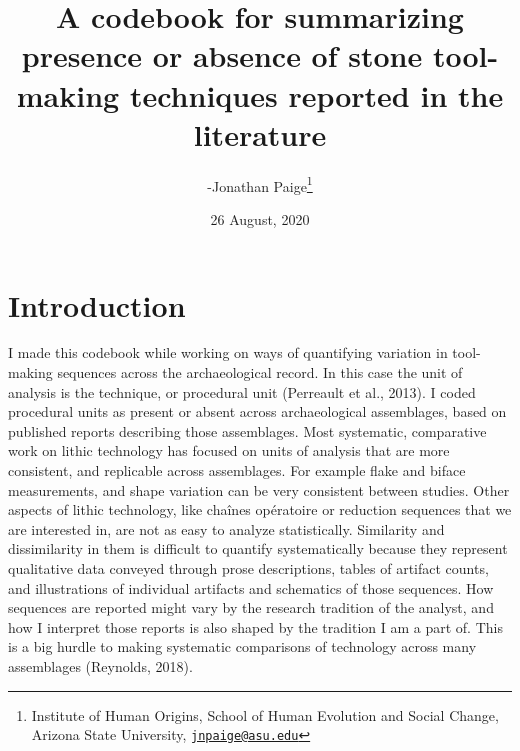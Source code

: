\documentclass[
]{article}
\title{A codebook for summarizing presence or absence of stone tool-making
techniques reported in the literature}
\author{-Jonathan Paige\footnote{Institute of Human Origins, School of Human
  Evolution and Social Change, Arizona State University,
  \href{mailto:jnpaige@asu.edu}{\nolinkurl{jnpaige@asu.edu}}}}
\date{26 August, 2020}
\begin{document}
\maketitle

{
\setcounter{tocdepth}{3}
\tableofcontents
}
\setlength{\parskip}{15pt}

\hypertarget{introduction}{%
\section{Introduction}\label{introduction}}

I made this codebook while working on ways of quantifying variation in
tool-making sequences across the archaeological record. In this case the
unit of analysis is the technique, or procedural unit (Perreault et al.,
2013). I coded procedural units as present or absent across
archaeological assemblages, based on published reports describing those
assemblages. Most systematic, comparative work on lithic technology has
focused on units of analysis that are more consistent, and replicable
across assemblages. For example flake and biface measurements, and shape
variation can be very consistent between studies. Other aspects of
lithic technology, like chaînes opératoire or reduction sequences that
we are interested in, are not as easy to analyze statistically.
Similarity and dissimilarity in them is difficult to quantify
systematically because they represent qualitative data conveyed through
prose descriptions, tables of artifact counts, and illustrations of
individual artifacts and schematics of those sequences. How sequences
are reported might vary by the research tradition of the analyst, and
how I interpret those reports is also shaped by the tradition I am a
part of. This is a big hurdle to making systematic comparisons of
technology across many assemblages (Reynolds, 2018).
\end{document}
